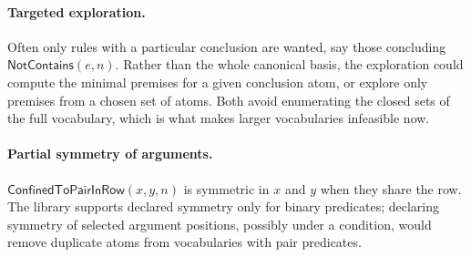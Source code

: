 \documentclass[11pt,a4paper]{article}
\theoremstyle{definition}
\theoremstyle{remark}
\newcommand{\pred}[1]{\mathsf{#1}}
\newcommand{\NotContains}{\pred{NotContains}}
\begin{document}
\paragraph{Targeted exploration.}
Often only rules with a particular conclusion are wanted, say those concluding $\NotContains(e, n)$. Rather than the whole canonical basis, the exploration could compute the minimal premises for a given conclusion atom, or explore only premises from a chosen set of atoms. Both avoid enumerating the closed sets of the full vocabulary, which is what makes larger vocabularies infeasible now.

\paragraph{Partial symmetry of arguments.}
$\pred{ConfinedToPairInRow}(x, y, n)$ is symmetric in $x$ and $y$ when they share the row. The library supports declared symmetry only for binary predicates; declaring symmetry of selected argument positions, possibly under a condition, would remove duplicate atoms from vocabularies with pair predicates.
\end{document}
